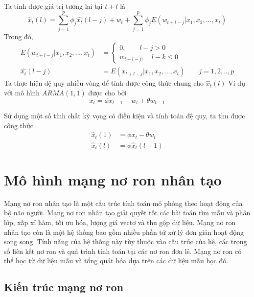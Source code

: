 Ta tính được giá trị tương lai tại $t+l$ là 
\begin{equation}
	 \hat{x}_t(l) = \sum\limits_{j=1}^p\phi_j\hat{x_t}(l-j) + w_t + \sum\limits_{j=1}^p\phi_jE(w_{t+l-j}|x_1,x_2,...,x_t)
\end{equation}   
Trong đó,
\begin{align}
E(w_{t+l-j}|x_1,x_2,...,x_t) &= \begin{cases}
									0, \qquad l-j > 0\\
									w_{t+l-j}, \quad l-k \leq 0
								\end {cases}\\
\hat{x_t}(l-j) &= E(x_{t+l-j}|x_1,x_2,...,x_t)\qquad j = 1,2,..,p
\end{align}
 Ta thực hiện đệ quy nhiều vòng để tính được công thức chung cho $\hat{x}_t(l)$
Ví dụ với mô hình $ARMA(1,1)$ được cho bởi
\begin{equation}
	x_t = \phi{x_{t-1}}+w_t + \theta{w_{t-1}}
\end{equation}

Sử dụng một số tính chất kỳ vọng có điều kiện và tính toán đệ quy, ta thu được công thức
\begin{align}
	\hat{x}_t(1) &= \phi{x_t} - \theta{w_t} \\
	\hat{x}_t(l) &= \phi\hat{x}_t(l-1)
\end{align}

\section{Mô hình mạng nơ ron nhân tạo}
Mạng nơ ron nhân tạo là một cấu trúc tính toán mô phỏng theo hoạt động của bộ não người. Mạng nơ ron nhân tạo giải quyết tốt các bài toán tìm mẫu và phân lớp, xấp xỉ hàm, tối ưu hóa, lượng giá vectơ và thu gộp dữ liệu. Mạng nơ ron nhân tạo còn là một hệ thống bao gồm nhiều phần tử xử lý đơn giản hoạt động song song. Tính năng của hệ thống này tùy thuộc vào cấu trúc của hệ, các trọng số liên kết nơ ron và quá trình tính toán tại các nơ ron đơn lẻ. Mạng nơ ron có thể học từ dữ liệu mẫu và tổng quát hóa dựa trên các dữ liệu mẫu học đó. 
\subsection{Kiến trúc mạng nơ ron}
